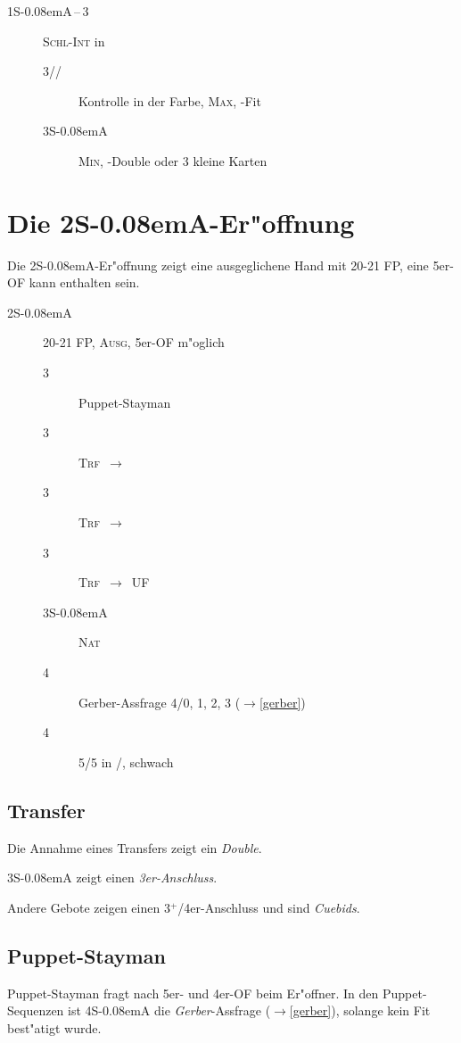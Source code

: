 \documentclass[11pt,german,twocolumn,twoside]{scrartcl}
\def\pi{\Sp\xspace}
\def\co{\He\xspace}
\def\tr{\Cl\xspace}
\def\sa{\nobreak\textsf{S\kern-0.08emA}\xspace}
\def\ofa{\nobreak\textsf{OF}\xspace}
\def\ufa{\nobreak\textsf{UF}\xspace}
\def\pik{\nobreak\hspace{\cardskip}\Sp\xspace}
\def\coe{\nobreak\hspace{\cardskip}\He\xspace}
\def\kar{\nobreak\hspace{\cardskip}\Di\xspace}
\def\tre{\nobreak\hspace{\cardskip}\Cl\xspace}
\def\SA{\nobreak\hspace{\cardskip}\sa}
\def\good{$^+$\xspace}
\def\ra{$\rightarrow$\xspace}
\def\sep{\,--\,}
\newcommand{\conv}[1]{\emph{#1}}
\def\bal{\textsc{Ausg}\xspace}
\def\nat{\textsc{Nat}\xspace}
\def\maxi{\textsc{Max}\xspace}
\def\mini{\textsc{Min}\xspace}
\def\xfer{\textsc{Trf}\xspace}
\def\xferto{\xfer{}~\ra~}
\def\slamint{\textsc{Schl-Int}\xspace}
\def\bdsc{\begin{description}}
\def\edsc{\end{description}}
\newcommand{\Index}[1]{#1\index{#1}}
\begin{document}
\bdsc
  \item[1\SA{}\sep3\tre] \slamint in \tr
  \bdsc
    \item[3\kar/\co/\pi] Kontrolle in der Farbe, \maxi, \tr-Fit
    \item[3\SA] \mini, \tr-Double oder 3 kleine Karten
  \edsc
\edsc

\newpage
\section{Die 2\SA-Er"offnung}

Die 2\SA-Er"offnung zeigt eine ausgeglichene Hand mit 20-21 FP, eine 5er-\ofa
kann enthalten sein.

\bdsc
\item[2\SA] 20-21 FP, \bal, 5er-\ofa m"oglich
  \bdsc
  \item[3\tre] Puppet-Stayman
  \item[3\kar] \xferto \co
  \item[3\coe] \xferto \pi
  \item[3\pik] \xferto \ufa
  \item[3\SA] \nat
  \item[4\tre] \Index{Gerber}-Assfrage 4/0, 1, 2, 3 (\ra \ref{gerber})
  \item[4\kar] 5/5 in \pi/\co, schwach
  \edsc
\edsc

\subsection{Transfer}

\begin{compactitem}
\item Die Annahme eines Transfers zeigt ein \emph{Double}.
\item 3\SA zeigt einen \emph{3er-Anschluss}.
\item Andere Gebote zeigen einen 3\good{}/4er-Anschluss und sind \emph{Cuebids}.
\end{compactitem}

\subsection{Puppet-Stayman}

Puppet-Stayman fragt nach 5er- und 4er-\ofa beim Er"offner. In den
Puppet-Sequenzen ist 4\SA die \conv{Gerber}-Assfrage (\ra \ref{gerber}),
solange kein Fit best"atigt wurde.
\end{document}
